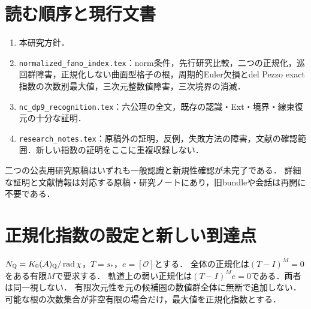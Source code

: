 \documentclass[11pt,a4paper]{ltjsarticle}
\begin{document}
\section{読む順序と現行文書}
\begin{enumerate}
\item 本研究方針．
\item \texttt{normalized\_fano\_index.tex}：norm条件，先行研究比較，二つの正規化，巡回群障害，正規化しない曲面型格子の根，周期的Euler欠損とdel Pezzo exact指数の次数別最大値，三次元整数値障害，三次境界の消滅．
\item \texttt{nc\_dp9\_recognition.tex}：六公理の全文，既存の認識・Ext・境界・線束復元の十分な証明．
\item \texttt{research\_notes.tex}：原稿外の証明，反例，失敗方法の障害，文献の確認範囲．新しい指数の証明をここに重複収録しない．
\end{enumerate}
二つの公表用研究原稿はいずれも一般認識と新規性確認が未完了である．
詳細な証明と文献情報は対応する原稿・研究ノートにあり，旧bundleや会話は再開に不要である．

\section{正規化指数の設定と新しい到達点}
$N_{\mathbb Q}=K_0(\mathcal A)_{\mathbb Q}/\operatorname{rad}\chi$，$T=s_*$，$e=[\mathcal O]$とする．
全体の正規化は$(T-I)^M=0$をある有限$M$で要求する．
軌道上の弱い正規化は$(T-I)^Me=0$である．両者は同一視しない．
有限次元性を元の候補圏の数値群全体に無断で追加しない．
可能な根の次数集合が非空有限の場合だけ，最大値を正規化指数とする．
\end{document}

